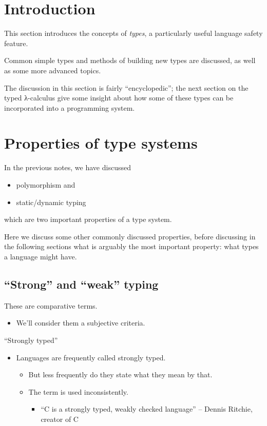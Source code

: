 \documentclass[11pt]{article}
\theoremstyle{definition}
\begin{document}
\section{Introduction}
\label{sec:org1593f15}

This section introduces the concepts of \emph{types},
a particularly useful language safety feature.

Common simple types and methods of building new types are discussed,
as well as some more advanced topics.

The discussion in this section is fairly “encyclopedic”;
the next section on the typed λ-calculus give some insight about
how some of these types can be incorporated into a programming system.

\section{Properties of type systems}
\label{sec:org22411ce}

In the previous notes, we have discussed
\begin{itemize}
\item polymorphism and
\item static/dynamic typing
\end{itemize}
which are two important properties of a type system.

Here we discuss some other commonly discussed properties,
before discussing in the following sections
what is arguably the most important property:
what types a language might have.

\subsection{“Strong” and “weak” typing}
\label{sec:org1805043}

These are comparative terms.
\begin{itemize}
\item We'll consider them a subjective criteria.
\end{itemize}

“Strongly typed”
\begin{itemize}
\item Languages are frequently called strongly typed.
\begin{itemize}
\item But less frequently do they state what they mean by that.
\item The term is used inconsistently.
\begin{itemize}
\item “C is a strongly typed, weakly checked language”
– Dennis Ritchie, creator of C
\end{itemize}
\end{itemize}
\end{itemize}
\end{document}
